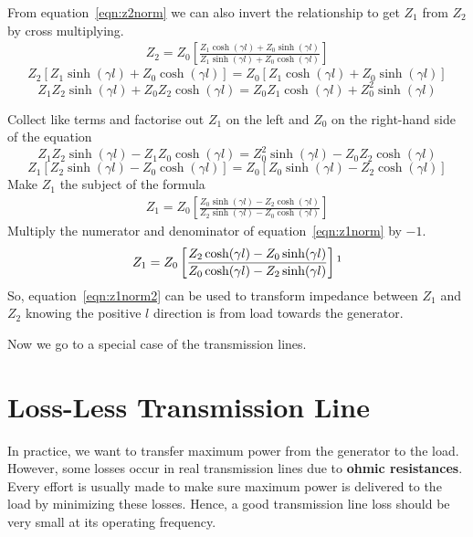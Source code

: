 From equation~\eqref{eqn:z2norm} we can also invert the relationship to get $Z_1$ from $Z_2$ by cross multiplying.
\begin{align*}
Z_2 = Z_0\left[\frac{Z_1\cosh(\gamma l) + Z_0\sinh(\gamma l)}{Z_1 \sinh(\gamma l) + Z_0 \cosh(\gamma l)}\right]
\end{align*}
\begin{dmath*}
Z_2\left[Z_1\sinh(\gamma l) + Z_0\cosh(\gamma l)\right] = Z_0\left[Z_1\cosh(\gamma l) + Z_0\sinh(\gamma l)\right]
\end{dmath*}
\[Z_1Z_2\sinh(\gamma l) + Z_0Z_2\cosh(\gamma l) = Z_0Z_1\cosh(\gamma l) + Z_0^2\sinh(\gamma l)\]

Collect like terms and factorise out $Z_1$ on the left and $Z_0$ on the right-hand side of the equation
\begin{dmath*}
Z_1Z_2\sinh(\gamma l) - Z_1Z_0\cosh(\gamma l) = Z_0^2\sinh(\gamma l) - Z_0Z_2\cosh(\gamma l)
\end{dmath*}
\begin{dmath*}
Z_1\left[Z_2\sinh(\gamma l) - Z_0\cosh(\gamma l)\right] = Z_0\left[Z_0\sinh(\gamma l) - Z_2\cosh(\gamma l)\right]
\end{dmath*}
Make $Z_1$ the subject of the formula
\begin{align}
Z_1 = Z_0\left[\frac{Z_0\sinh(\gamma l) - Z_2\cosh(\gamma l)}{Z_2\sinh(\gamma l) - Z_0\cosh(\gamma l)}\right]
\label{eqn:z1norm}
\end{align}
Multiply the numerator and denominator of equation~\eqref{eqn:z1norm} by $-1$.
\begin{equation}
Z_1 = Z_0\left[\frac{Z_2\cosh(\gamma l) - Z_0\sinh(\gamma l)}{Z_0\cosh(\gamma l) - Z_2\sinh(\gamma l)}\right]\footnotemark
\label{eqn:z1norm2}
\end{equation}
So, equation~\eqref{eqn:z1norm2} can be used to transform impedance between $Z_1$ and $Z_2$ knowing the positive $l$ direction is from load towards the generator.

Now we go to a special case of the transmission lines.

\section{Loss-Less Transmission Line}
In practice, we want to transfer maximum power from the generator to the load. However, some losses occur in real transmission lines due to \textbf{ohmic resistances}. Every effort is usually made to make sure maximum power is delivered to the load by minimizing these losses. Hence, a good transmission line loss should be very small at its operating frequency.

